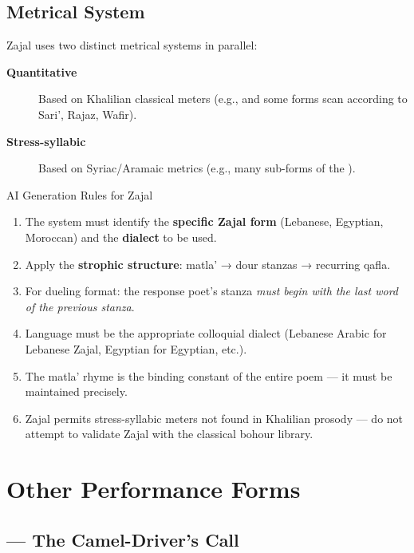 \subsection{Metrical System}

Zajal uses two distinct metrical systems in parallel:
\begin{description}
  \item[\textbf{Quantitative}] Based on Khalilian classical meters (e.g.,  and some forms scan according to Sari', Rajaz, Wafir).
  \item[\textbf{Stress-syllabic}] Based on Syriac/Aramaic metrics (e.g., many sub-forms of the ).
\end{description}

\begin{rulebox}{AI Generation Rules for Zajal}
\begin{enumerate}
  \item The system must identify the \textbf{specific Zajal form} (Lebanese, Egyptian, Moroccan) and the \textbf{dialect} to be used.
  \item Apply the \textbf{strophic structure}: matla' → dour stanzas → recurring qafla.
  \item For dueling format: the response poet's stanza \textit{must begin with the last word of the previous stanza}.
  \item Language must be the appropriate colloquial dialect (Lebanese Arabic for Lebanese Zajal, Egyptian for Egyptian, etc.).
  \item The matla' rhyme is the binding constant of the entire poem — it must be maintained precisely.
  \item Zajal permits stress-syllabic meters not found in Khalilian prosody — do not attempt to validate Zajal with the classical bohour library.
\end{enumerate}
\end{rulebox}

\section{Other Performance Forms}
\label{sec:other_performance}

\subsection{ — The Camel-Driver's Call}

